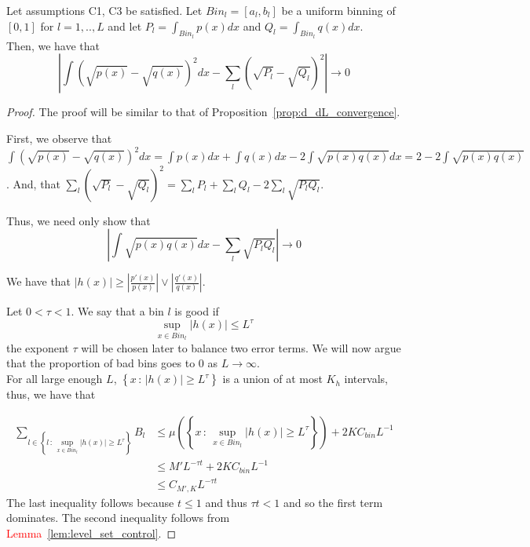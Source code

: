 \begin{proposition}
\label{prop:H_HL_convergence2}
Let assumptions C1, C3 be satisfied. Let $Bin_l = [a_l, b_l]$ be a uniform binning of $[0,1]$ for $l=1,..,L$ and let $P_l = \int_{Bin_l} p(x) dx$ and $Q_l = \int_{Bin_l} q(x) dx$.\\

Then, we have that
\[
\left| \int (\sqrt{p(x)} - \sqrt{q(x)})^2 dx - \sum_l (\sqrt{P_l} - \sqrt{Q_l})^2 \right| \rightarrow 0
\]

\end{proposition}



\begin{proof}

The proof will be similar to that of Proposition~\ref{prop:d_dL_convergence}. 


First, we observe that $\int (\sqrt{p(x)} - \sqrt{q(x)})^2 dx = \int p(x) dx + \int q(x) dx - 2 \int \sqrt{p(x)q(x)} dx = 2 - 2 \int \sqrt{p(x)q(x)}$. And, that $\sum_l (\sqrt{P_l} - \sqrt{Q_l})^2 = \sum_l P_l + \sum_l Q_l - 2 \sum_l \sqrt{P_l Q_l}$. 

Thus, we need only show that 
\[
\left| \int \sqrt{p(x)q(x)} dx - \sum_l \sqrt{P_l Q_l} \right| \rightarrow 0
\]


We have that $|h(x)| \geq 
\left| \frac{p'(x)}{p(x)} \right| \vee \left| \frac{q'(x)}{q(x)} \right|$. 

Let $0 < \tau < 1$. We say that a bin $l$ is good if
$$
\sup_{x \in Bin_l} |h(x)| \leq L^\tau
$$
the exponent $\tau$ will be chosen later to balance two error terms. We will now argue that the proportion of bad bins goes to 0 as $L \rightarrow \infty$.\\


For all large enough $L$, $\left \{x \,:\, 
    |h(x)|  \geq L^\tau \right \}$ is a union of at most $K_h$ intervals, thus, we have that

\begin{align*}
\sum_{l \in \left \{ l \,:\, \sup_{x \in Bin_l} |h(x)| 
           \geq L^\tau \right \}}  B_l &\leq 
   \mu \left( \left\{x \,:\, \sup_{x \in Bin_l} |h(x)|
         \geq L^\tau \right\} \right) + 2 K C_{bin} L^{-1} \\
  &\leq M' L^{-\tau t}  + 2K C_{bin} L^{-1} \\
  & \leq C_{M', K} L^{ - \tau t} 
\end{align*}
The last inequality follows because $t \leq 1$ and thus $\tau t < 1$ and so the first term dominates. The second inequality follows from \textcolor{red}{Lemma}~\ref{lem:level_set_control}.


\end{proof}
